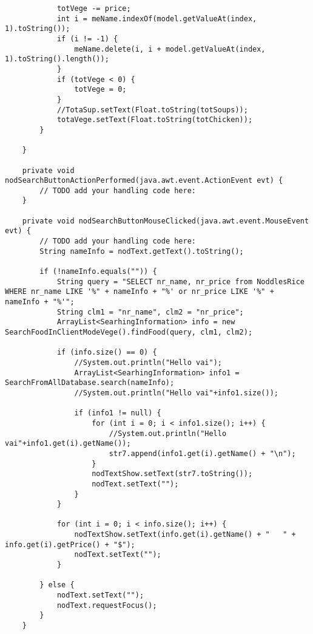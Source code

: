 \documentclass[12pt,a4paper]{article}
\begin{document}
\begin{lstlisting}
            totVege -= price;
            int i = meName.indexOf(model.getValueAt(index, 1).toString());
            if (i != -1) {
                meName.delete(i, i + model.getValueAt(index, 1).toString().length());
            }
            if (totVege < 0) {
                totVege = 0;
            }
            //TotaSup.setText(Float.toString(totSoups));
            totaVege.setText(Float.toString(totChicken));
        }

    }                                       

    private void nodSearchButtonActionPerformed(java.awt.event.ActionEvent evt) {                                                
        // TODO add your handling code here:
    }                                               

    private void nodSearchButtonMouseClicked(java.awt.event.MouseEvent evt) {                                             
        // TODO add your handling code here:
        String nameInfo = nodText.getText().toString();

        if (!nameInfo.equals("")) {
            String query = "SELECT nr_name, nr_price from NoddlesRice WHERE nr_name LIKE '%" + nameInfo + "%' or nr_price LIKE '%" + nameInfo + "%'";
            String clm1 = "nr_name", clm2 = "nr_price";
            ArrayList<SearhingInformation> info = new SearchFoodInClientModeVege().findFood(query, clm1, clm2);

            if (info.size() == 0) {
                //System.out.println("Hello vai");
                ArrayList<SearhingInformation> info1 = SearchFromAllDatabase.search(nameInfo);
                //System.out.println("Hello vai"+info1.size());

                if (info1 != null) {
                    for (int i = 0; i < info1.size(); i++) {
                        //System.out.println("Hello vai"+info1.get(i).getName());
                        str7.append(info1.get(i).getName() + "\n");
                    }
                    nodTextShow.setText(str7.toString());
                    nodText.setText("");
                }
            }

            for (int i = 0; i < info.size(); i++) {
                nodTextShow.setText(info.get(i).getName() + "   " + info.get(i).getPrice() + "$");
                nodText.setText("");
            }

        } else {
            nodText.setText("");
            nodText.requestFocus();
        }
    }                                            


\end{lstlisting}
\end{document}
